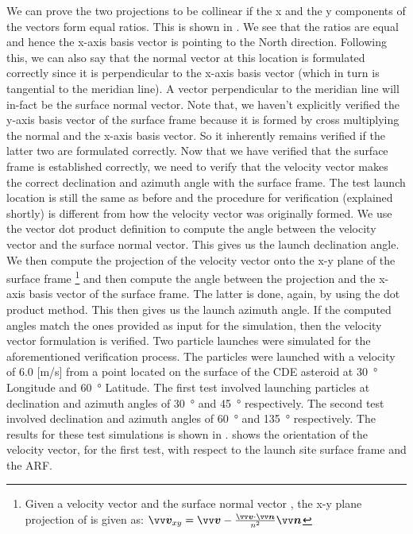 \FloatBarrier
We can prove the two projections to be collinear if the x and the y components of the vectors form equal ratios. This is shown in . We see that the ratios are equal and hence the x-axis basis vector is pointing to the North direction. Following this, we can also say that the normal vector at this location is formulated correctly since it is perpendicular to the x-axis basis vector (which in turn is tangential to the meridian line). A vector perpendicular to the meridian line will in-fact be the surface normal vector. Note that, we haven't explicitly verified the y-axis basis vector of the surface frame because it is formed by cross multiplying the normal and the x-axis basis vector. So it inherently remains verified if the latter two are formulated correctly.
%
\newline\newline
%
Now that we have verified that the surface frame is established correctly, we need to verify that the velocity vector makes the correct declination and azimuth angle with the surface frame. The test launch location is still the same as before and the procedure for verification (explained shortly) is different from how the velocity vector was originally formed. We use the vector dot product definition to compute the angle between the velocity vector and the surface normal vector. This gives us the launch declination angle. We then compute the projection of the velocity vector onto the x-y plane of the surface frame \footnote{Given a velocity vector  and the surface normal vector , the x-y plane projection of  is given as: $\bv{v}_{xy} = \bv{v} - \frac{\bv{v} \cdotp \bv{n}}{n^2} \bv{n}$} and then compute the angle between the projection and the x-axis basis vector of the surface frame. The latter is done, again, by using the dot product method. This then gives us the launch azimuth angle. If the computed angles match the ones provided as input for the simulation, then the velocity vector formulation is verified.
%
\newline\newline
%
Two particle launches were simulated for the aforementioned verification process. The particles were launched with a velocity of 6.0 [m/s] from a point located on the surface of the \gls{CDE} asteroid at \SI{30}{\degree} Longitude and \SI{60}{\degree} Latitude. The first test involved launching particles at declination and azimuth angles of \SI{30}{\degree} and \SI{45}{\degree} respectively. The second test involved declination and azimuth angles of \SI{60}{\degree} and \SI{135}{\degree} respectively. The results for these test simulations is shown in .  shows the orientation of the velocity vector, for the first test, with respect to the launch site surface frame and the \gls{ARF}.
